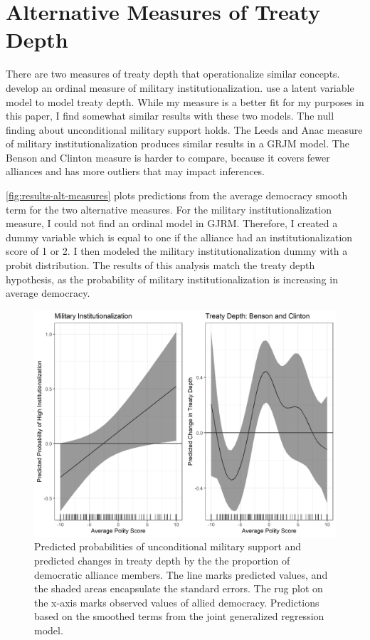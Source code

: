 \documentclass[12pt]{article}
\begin{document}
\section{Alternative Measures of Treaty Depth}


There are two measures of treaty depth that operationalize similar concepts. 
\citet{LeedsAnac2005} develop an ordinal measure of military institutionalization.
\citet{BensonClinton2016} use a latent variable model to model treaty depth. 
While my measure is a better fit for my purposes in this paper, I find somewhat similar results with these two models. 
The null finding about unconditional military support holds. 
The Leeds and Anac measure of military institutionalization produces similar results in a GRJM model. 
The Benson and Clinton measure is harder to compare, because it covers fewer alliances and has more outliers that may impact inferences.


\autoref{fig:results-alt-measures} plots predictions from the average democracy smooth term for the two alternative measures. 
For the military institutionalization measure, I could not find an ordinal model in GJRM. 
Therefore, I created a dummy variable which is equal to one if the alliance had an institutionalization score of 1 or 2. 
I then modeled the military institutionalization dummy with a probit distribution. 
The results of this analysis match the treaty depth hypothesis, as the probability of military institutionalization is increasing in average democracy. 


\begin{figure}
\includegraphics[width=.95\textwidth]{results-alt-measures.png}  
\caption{Predicted probabilities of unconditional military support and predicted changes in treaty depth by the the proportion of democratic alliance members. The line marks predicted values, and the shaded areas encapsulate the standard errors. The rug plot on the x-axis marks observed values of allied democracy. Predictions based on the smoothed terms from the joint generalized regression model.}
\label{fig:results-alt-measures}
\end{figure}
\end{document}
